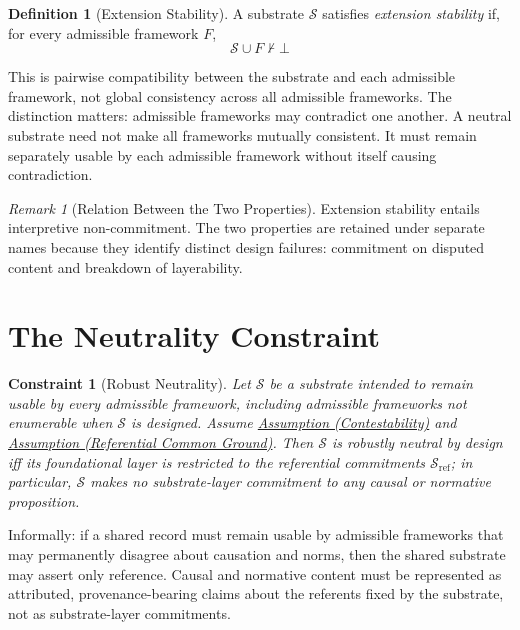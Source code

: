 \documentclass[11pt]{article}
\theoremstyle{plain}
\newtheorem{constraint}[theorem]{Constraint}
\theoremstyle{definition}
\newtheorem{definition}[theorem]{Definition}
\theoremstyle{remark}
\newtheorem{remark}[theorem]{Remark}
\newcommand{\AssumpRef}[2]{\hyperref[#1]{Assumption (#2)}}
\newcommand{\Substrate}{\mathcal{S}}
\newcommand{\SubstrateRef}{\mathcal{S}_{\mathrm{ref}}}
\newcommand{\Framework}{F}
\newcommand{\notentails}{\nvdash}
\begin{document}
\begin{definition}[Extension Stability]
  \label{se100.def.ExtensionStability}
  A substrate $\Substrate$ satisfies \emph{extension stability} if, for every
  admissible framework $\Framework$,
  \[
    \Substrate \cup \Framework \notentails \bot
  \]
\end{definition}

This is pairwise compatibility between the substrate and each admissible
framework, not global consistency across all admissible frameworks.
The distinction matters: admissible frameworks may contradict one another.
A neutral substrate need not make all frameworks mutually consistent.
It must remain separately usable by each admissible framework without itself causing
contradiction.

\begin{remark}[Relation Between the Two Properties]
  \label{se100.remark.PropertyRelation}
  Extension stability entails interpretive non-commitment.
  The two properties are retained under separate names
  because they identify distinct design failures:
  commitment on disputed content and breakdown of layerability.
\end{remark}

\section{The Neutrality Constraint}
\label{sec:neutrality}

\begin{constraint}[Robust Neutrality]
  \label{se100.constraint.Neutrality}
  Let $\Substrate$ be a substrate intended
  to remain usable by every admissible framework,
  including admissible frameworks not enumerable when $\Substrate$ is designed.
  Assume
  \AssumpRef{se100.def.Contestability}{Contestability} and
  \AssumpRef{se100.def.ReferentialCommonGround}{Referential Common Ground}.
  Then $\Substrate$ is robustly neutral by design
  iff its foundational layer is restricted
  to the referential commitments $\SubstrateRef$;
  in particular, $\Substrate$ makes no substrate-layer commitment
  to any causal or normative proposition.
\end{constraint}

Informally: if a shared record must remain usable by admissible frameworks that
may permanently disagree about causation and norms, then the shared substrate
may assert only reference.
Causal and normative content must be represented as
attributed, provenance-bearing claims
about the referents fixed by the substrate, not as substrate-layer commitments.
\end{document}
